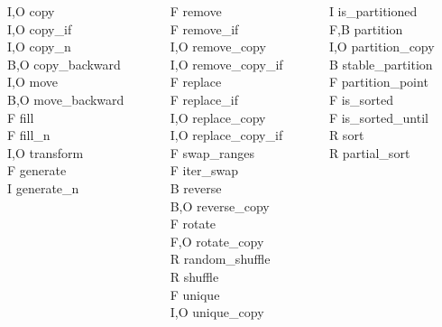 \documentclass{beamer}
\begin{document}
{{\begin{columns}[T]
\begin{column}{0.2\textwidth}
      I,O copy \\
      I,O copy\_if \\
      I,O copy\_n \\
      B,O copy\_backward \\
      I,O move \\
      B,O move\_backward \\
      F fill \\
      F fill\_n \\
      I,O transform \\
      F generate \\
      I generate\_n \\
   \end{column}
   \begin{column}{0.2\textwidth}
      F remove \\
      F remove\_if \\
      I,O remove\_copy \\
      I,O remove\_copy\_if \\
      F replace \\
      F replace\_if \\
      I,O replace\_copy \\
      I,O replace\_copy\_if \\
      F swap\_ranges \\
      F iter\_swap \\
      B reverse \\
      B,O reverse\_copy \\
      F rotate \\
      F,O rotate\_copy \\
      R random\_shuffle \\
      R shuffle \\
      F unique \\
      I,O unique\_copy
   \end{column}
   \begin{column}{0.3\textwidth}
      I is\_partitioned \\
      F,B partition \\
      I,O partition\_copy \\
      B stable\_partition \\
      F partition\_point \\
      F is\_sorted \\
      F is\_sorted\_until \\
      R sort \\
      R partial\_sort \\

\end{column}
\end{columns}}}
\end{document}
